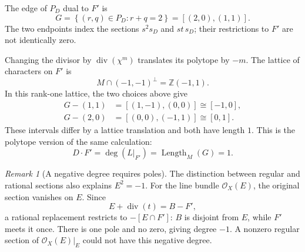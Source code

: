 \documentclass[11pt]{article}
\theoremstyle{definition}
\theoremstyle{remark}
\newtheorem{Rmk}{Remark}
\DeclareMathOperator{\divisor}{div}
\newcommand{\cO}{\mathcal{O}}
\newcommand{\set}[1]{\left\{#1\right\}}
\newcommand{\bZ}{\mathbb{Z}}
\newcommand{\isom}{\cong}
\begin{document}
The edge of \(P_D\) dual to \(F'\) is
\[
    G=\set{(r,q)\in P_D:r+q=2}
      =[(2,0),(1,1)].
\]
The two endpoints index the sections \(s^2s_D\) and \(st\,s_D\);
their restrictions to \(F'\) are not identically zero.

Changing the divisor by \(\divisor(\chi^m)\) translates its
polytope by \(-m\). The lattice of characters on \(F'\) is
\[
    M\cap(-1,-1)^\perp=\bZ(-1,1).
\]
In this rank-one lattice, the two choices above give
\[
    \begin{aligned}
        G-(1,1)&=[(1,-1),(0,0)]\isom[-1,0],\\
        G-(2,0)&=[(0,0),(-1,1)]\isom[0,1].
    \end{aligned}
\]
These intervals differ by a lattice translation and both have length
\(1\). This is the polytope version of the same calculation:
\[
    \boxed{D\cdot F'=\deg(L|_{F'})
          =\operatorname{Length}_M(G)=1.}
\]

\begin{Rmk}[A negative degree requires poles]
    The distinction between regular and rational sections also explains
    \(E^2=-1\). For the line bundle \(\cO_X(E)\), the original
    section vanishes on \(E\). Since
    \[
        E+\divisor(t)=B-F',
    \]
    a rational replacement restricts to
    \(-[E\cap F']\): \(B\) is disjoint from \(E\), while \(F'\)
    meets it once. There is one pole and no zero, giving degree
    \(-1\). A nonzero regular section of \(\cO_X(E)|_E\) could not
    have this negative degree.
\end{Rmk}
\end{document}
